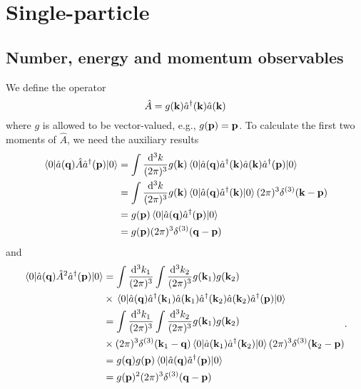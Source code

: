 \section{Single-particle}

\subsection{Number, energy and momentum observables}

We define the operator
\begin{equation}
	\hat{A}
	=
	g(\vb{k})
	\hat{a}^\dagger(\vb{k})
	\hat{a}(\vb{k})
\end{equation}
where $g$ is allowed to be vector-valued, e.g., $g(\vb{p})=\vb{p}$.
To calculate the first two moments of $\hat{A}$, we need the auxiliary results
\begin{equation}
	\begin{split}
		\expval{\hat{a}(\vb{q})\hat{A}\hat{a}^\dagger(\vb{p})}{0}
		&=
		\int\frac{\dd[3]{k}}{(2\pi)^3}
		g(\vb{k})
		\expval{\hat{a}(\vb{q})\hat{a}^\dagger(\vb{k})\hat{a}(\vb{k})\hat{a}^\dagger(\vb{p})}{0}
		\\
		&=
		\int\frac{\dd[3]{k}}{(2\pi)^3}
		g(\vb{k})
		\expval{\hat{a}(\vb{q})\hat{a}^\dagger(\vb{k})}{0}
		(2\pi)^3\delta^{(3)}(\vb{k}-\vb{p})
		\\
		&=
		g(\vb{p})
		\expval{\hat{a}(\vb{q})\hat{a}^\dagger(\vb{p})}{0}
		\\
		&=
		g(\vb{p})
		(2\pi)^3\delta^{(3)}(\vb{q}-\vb{p})
	\end{split}
\end{equation}
and
\begin{equation}
	\begin{split}
		\expval{\hat{a}(\vb{q})\hat{A}^2\hat{a}^\dagger(\vb{p})}{0}
		&=
		\int\frac{\dd[3]{k_1}}{(2\pi)^3}
		\int\frac{\dd[3]{k_2}}{(2\pi)^3}
		g(\vb{k}_1)g(\vb{k}_2)
		\\
		&\times
		\expval{
			\hat{a}(\vb{q})
			\hat{a}^\dagger(\vb{k}_1)
			\hat{a}(\vb{k}_1)
			\hat{a}^\dagger(\vb{k}_2)
			\hat{a}(\vb{k}_2)
			\hat{a}^\dagger(\vb{p})
		}{0}
		\\
		&=
		\int\frac{\dd[3]{k_1}}{(2\pi)^3}
		\int\frac{\dd[3]{k_2}}{(2\pi)^3}
		g(\vb{k}_1)g(\vb{k}_2)
		\\
		&\times
		(2\pi)^3\delta^{(3)}(\vb{k}_1-\vb{q})
		\expval{
			\hat{a}(\vb{k}_1)
			\hat{a}^\dagger(\vb{k}_2)
		}{0}
		(2\pi)^3\delta^{(3)}(\vb{k}_2-\vb{p})
		\\
		&=
		g(\vb{q})g(\vb{p})
		\expval{
			\hat{a}(\vb{q})
			\hat{a}^\dagger(\vb{p})
		}{0}
		\\
		&=
		g(\vb{p})^2
		(2\pi)^3\delta^{(3)}(\vb{q}-\vb{p})
	\end{split}
	.
\end{equation}
